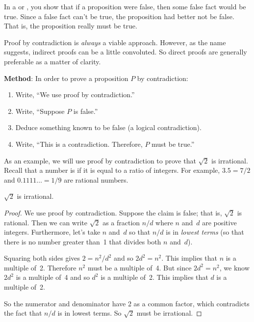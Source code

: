 In a  or , you show that
if a proposition were false, then some false fact would be true.  Since a
false fact can't be true, the proposition had better not be false.  That
is, the proposition really must be true.

Proof by contradiction is \emph{always} a viable approach.  However, as
the name suggests, indirect proofs can be a little convoluted.  So direct
proofs are generally preferable as a matter of clarity.

\textbf{Method}: In order to prove a proposition $P$ by contradiction:

\begin{enumerate}

\item Write, ``We use proof by contradiction.''

\item Write, ``Suppose $P$ is false.''

\item Deduce something known to be false (a logical contradiction).

\item Write, ``This is a contradiction.  Therefore, $P$ must be
true.''

\end{enumerate}


As an example, we will use proof by contradiction to prove that
$\sqrt{2}$ is irrational.  Recall that a number is  if
it is equal to a ratio
of integers.  For example, $3.5 = 7/2$ and $0.1111\dots = 1/9$ are
rational numbers.

\begin{theorem}\label{thm:sqrt2irr_by_contra}
$\sqrt{2}$ is irrational.
\end{theorem}

\begin{proof}

We use proof by contradiction.  Suppose the claim is false; that is,
$\sqrt{2}$ is rational.  Then we can write $\sqrt{2}$ as a fraction
$n/d$ where $n$ and~$d$ are positive integers.  Furthermore, let's
take $n$ and~$d$ so that $n/d$ is in \emph{lowest terms} (\ie so that
there is no number greater than~1 that divides both $n$ and~$d$).

Squaring both sides gives $2 = n^2/d^2$ and so $2 d^2 = n^2$.  This
implies that $n$ is a multiple of~2.  Therefore $n^2$ must be a
multiple of~4.  But since $2 d^2 = n^2$, we know $2d^2$ is a multiple
of~4 and so $d^2$ is a multiple of~2.  This implies that $d$ is a
multiple of~2.

So the numerator and denominator have 2 as a common factor, which
contradicts the fact that $n/d$ is in lowest terms.  So $\sqrt{2}$
must be irrational.
\end{proof}

